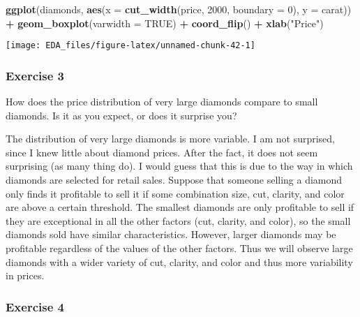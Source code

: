 \documentclass[]{book}
\newenvironment{Shaded}{\begin{snugshade}}{\end{snugshade}}
\newcommand{\DataTypeTok}[1]{\textcolor[rgb]{0.13,0.29,0.53}{#1}}
\newcommand{\DecValTok}[1]{\textcolor[rgb]{0.00,0.00,0.81}{#1}}
\newcommand{\KeywordTok}[1]{\textcolor[rgb]{0.13,0.29,0.53}{\textbf{#1}}}
\newcommand{\NormalTok}[1]{#1}
\newcommand{\OperatorTok}[1]{\textcolor[rgb]{0.81,0.36,0.00}{\textbf{#1}}}
\newcommand{\OtherTok}[1]{\textcolor[rgb]{0.56,0.35,0.01}{#1}}
\newcommand{\StringTok}[1]{\textcolor[rgb]{0.31,0.60,0.02}{#1}}
\theoremstyle{plain}
\theoremstyle{remark}
\theoremstyle{definition}
\theoremstyle{definition}
\theoremstyle{definition}
\theoremstyle{remark}
\begin{document}
\begin{Shaded}
\begin{Highlighting}[]
\KeywordTok{ggplot}\NormalTok{(diamonds, }\KeywordTok{aes}\NormalTok{(}\DataTypeTok{x =} \KeywordTok{cut_width}\NormalTok{(price, }\DecValTok{2000}\NormalTok{, }\DataTypeTok{boundary =} \DecValTok{0}\NormalTok{), }\DataTypeTok{y =}\NormalTok{ carat)) }\OperatorTok{+}
\StringTok{  }\KeywordTok{geom_boxplot}\NormalTok{(}\DataTypeTok{varwidth =} \OtherTok{TRUE}\NormalTok{) }\OperatorTok{+}
\StringTok{  }\KeywordTok{coord_flip}\NormalTok{() }\OperatorTok{+}
\StringTok{  }\KeywordTok{xlab}\NormalTok{(}\StringTok{"Price"}\NormalTok{)}
\end{Highlighting}
\end{Shaded}

\begin{center}\texttt{[image: EDA\_files/figure-latex/unnamed-chunk-42-1]} \end{center}

\hypertarget{exercise-3-14}{%
\subsubsection{Exercise 3}\label{exercise-3-14}}

How does the price distribution of very large diamonds compare to small
diamonds. Is it as you expect, or does it surprise you?

The distribution of very large diamonds is more variable. I am not
surprised, since I knew little about diamond prices. After the fact, it
does not seem surprising (as many thing do). I would guess that this is
due to the way in which diamonds are selected for retail sales. Suppose
that someone selling a diamond only finds it profitable to sell it if
some combination size, cut, clarity, and color are above a certain
threshold. The smallest diamonds are only profitable to sell if they are
exceptional in all the other factors (cut, clarity, and color), so the
small diamonds sold have similar characteristics. However, larger
diamonds may be profitable regardless of the values of the other
factors. Thus we will observe large diamonds with a wider variety of
cut, clarity, and color and thus more variability in prices.

\hypertarget{exercise-4-11}{%
\subsubsection{Exercise 4}\label{exercise-4-11}}
\end{document}
